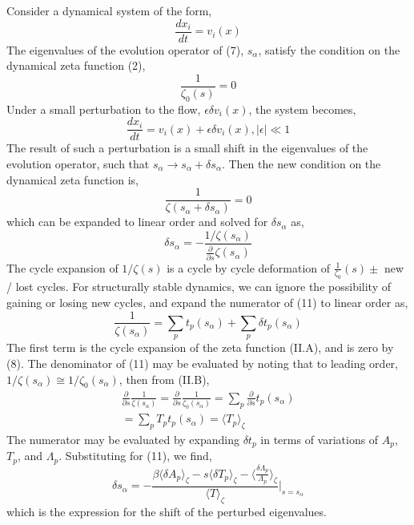 \documentclass[twocolumn,aip,cha]{revtex4-1}
\begin{document}
Consider a dynamical system of the form,
\begin{equation}
\frac{dx_{i}}{dt}=v_{i}(x)
\end{equation}
The eigenvalues of the evolution operator of (7), $s_{\alpha}$, satisfy the condition on the dynamical zeta function (2),
\begin{equation}
\frac{1}{\zeta_{0} (s)} = 0
\end{equation}
Under a small perturbation to the flow, $\epsilon \delta v_{i}(x)$, the system becomes,
\begin{equation}
\frac{dx_{i}}{dt}=v_{i}(x) + \epsilon \delta v_{i}(x), \vert\epsilon\vert \ll 1
\end{equation}
The result of such a perturbation is a small shift in the eigenvalues of the evolution operator, such that $s_{\alpha}\rightarrow s_{\alpha} + \delta s_{\alpha}$. Then the new condition on the dynamical zeta function is,
\begin{equation}
\frac{1}{\zeta(s_{\alpha}+\delta s_{\alpha})} = 0
\end{equation}
which can be expanded to linear order and solved for $\delta s_{\alpha}$ as,
\begin{equation}
\delta s_{\alpha} = -\frac{1/\zeta(s_{\alpha})}{\frac{\partial}{\partial s}\zeta (s_{\alpha})}
\end{equation}
The cycle expansion of $1/\zeta(s)$ is a cycle by cycle deformation of $\frac{1}{\zeta_{0}}(s)\pm$ new / lost cycles. For structurally stable dynamics, we can ignore the possibility of gaining or losing new cycles, and expand the numerator of (11) to linear order as,
\begin{equation}
\frac{1}{\zeta (s_{\alpha})} = \sum_{p}t_{p}(s_{\alpha}) + \sum_{p}\delta t_{p}(s_{\alpha})
\end{equation}
The first term is the cycle expansion of the zeta function (II.A), and is zero by (8). The denominator of (11) may be evaluated by noting that to leading order, $1/\zeta(s_{\alpha}) \cong 1/\zeta_{0}(s_{\alpha})$, then from (II.B),
\begin{eqnarray*}
\frac{\partial}{\partial s}\frac{1}{\zeta (s_{\alpha})} = \frac{\partial}{\partial s}\frac{1}{\zeta_{0} (s_{\alpha})} = \sum_{p}\frac{\partial}{\partial s}t_{p}(s_{\alpha}) \\ =  \sum_{p}T_{p}t_{p}(s_{\alpha}) =  \langle T_{p}\rangle_{\zeta}
\end{eqnarray*}
The numerator may be evaluated by expanding $\delta t_{p}$ in terms of variations of $A_{p}$, $T_{p}$, and $\Lambda_{p}$. Substituting for (11), we find,
\begin{equation}
\delta s_{\alpha} = -\frac{\beta \langle\delta A_{p}\rangle_\zeta - s\langle\delta T_{p}\rangle_{\zeta} - \langle\frac{\delta \Lambda_{p}}{\Lambda_{p}}\rangle_{\zeta}}{\langle T\rangle_{\zeta}}\vert_{s=s_{\alpha}}
\end{equation}
which is the expression for the shift of the perturbed eigenvalues.
\end{document}
